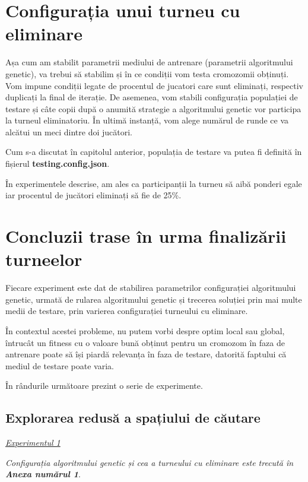 \section{Configurația unui turneu cu eliminare}

Așa cum am stabilit parametrii mediului de antrenare (parametrii algoritmului genetic), va trebui să stabilim și în ce condiții vom testa cromozomii obținuți. Vom impune condiții legate de procentul de jucatori care sunt eliminați, respectiv duplicați la final de iterație. De asemenea, vom stabili configurația populației de testare și câte copii după o anumită strategie a algoritmului genetic vor participa la turneul eliminatoriu. În ultimă instanță, vom alege numărul de runde ce va alcătui un meci dintre doi jucători. 
 
Cum s-a discutat în capitolul anterior, populația de testare va putea fi definită în fișierul \textbf{testing.config.json}.

În experimentele descrise, am ales ca participanții la turneu să aibă ponderi egale iar procentul de  jucători eliminați să fie de 25\%. 

\section {Concluzii trase în urma finalizării turneelor}

Fiecare experiment este dat de stabilirea parametrilor configurației algoritmului genetic, urmată de rularea algoritmului genetic și trecerea soluției prin mai multe medii de testare, prin varierea configurației turneului cu eliminare.

În contextul acestei probleme, nu putem vorbi despre optim local sau global, întrucât un fitness cu o valoare bună obținut pentru un cromozom în faza de antrenare poate să își piardă relevanța în faza de testare, datorită faptului că mediul de testare poate varia. 

În rândurile următoare prezint o serie de experimente.  

\subsection {Explorarea redusă a spațiului de căutare} 

\begin{center}
	\underline{\textit{Experimentul 1}}
\end{center}

\textit{Configurația algoritmului genetic și cea a turneului cu eliminare este trecută în \textbf{Anexa numărul 1}}.\\

